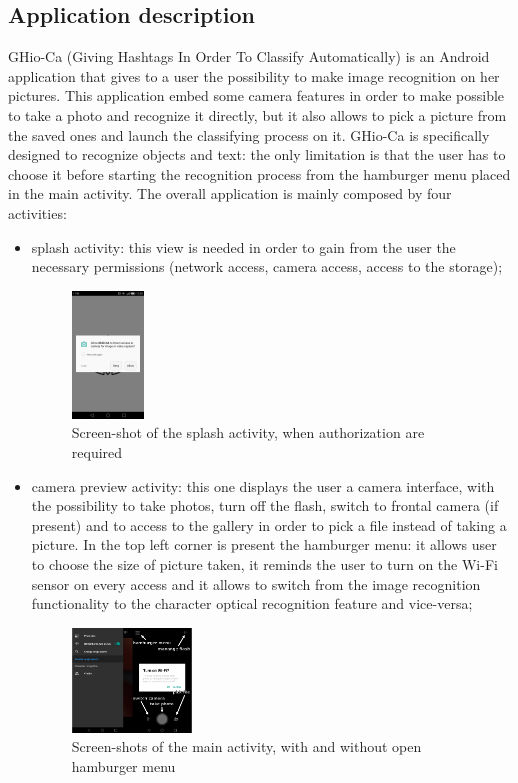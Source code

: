 \subsection{Application description}
GHio-Ca (Giving Hashtags In Order To Classify Automatically) is an Android 
application that gives to a user the possibility to make image recognition on 
her pictures. This application embed some camera features in order to make 
possible to take a photo and recognize it directly, but it also allows to pick 
a picture from the saved ones and launch the classifying process on it.
GHio-Ca is specifically designed to recognize objects and text: the only 
limitation is that the user has to choose it before starting the 
recognition process from the hamburger menu placed in the main activity. 
The overall application is mainly composed by four activities:
\begin{itemize}
  \item splash activity: this view is needed in order to gain from the user
    the necessary permissions (network access, camera access, access to 
    the storage);
    \begin{figure}[h]
        \centering
        \includegraphics[width=0.18\textwidth]{../img/splash}
        \caption{Screen-shot of the splash activity, when authorization are 
                 required}
        \label{fig:splash}
    \end{figure}

  \item camera preview activity: this one displays the user a camera
    interface, with the possibility to take photos, turn off the flash, switch 
    to frontal camera (if present) and to access to the gallery in order to 
    pick a file instead of taking a picture. In the top left corner is present 
    the hamburger menu: it allows user to choose the size of picture taken, 
    it reminds the user to turn on the Wi-Fi sensor on every access and it 
    allows to switch from the image recognition functionality to the 
    character optical recognition feature and vice-versa;
    \begin{figure}[h]
        \centering
        \includegraphics[width=0.30\textwidth]{../img/main_activity}
        \caption{Screen-shots of the main activity, with and without open 
                 hamburger menu}
        \label{fig:splash}
    \end{figure}


\end{itemize}
